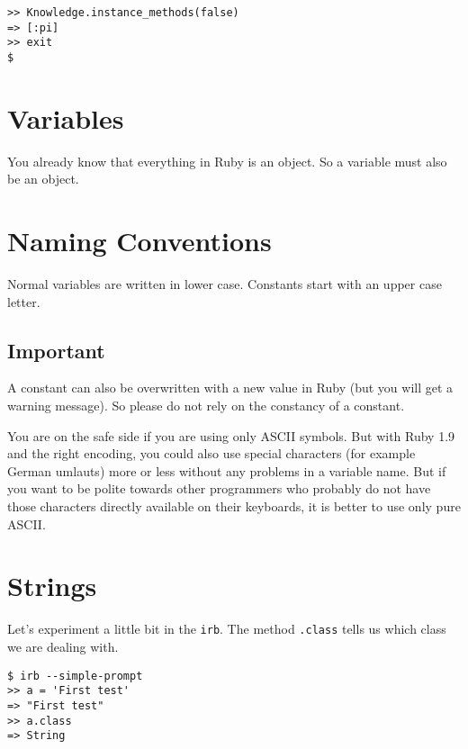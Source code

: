 \documentclass[a4paper]{book}
\begin{document}
\begin{shaded}\begin{verbatim}
>> Knowledge.instance_methods(false)
=> [:pi]
>> exit
$
\end{verbatim}\end{shaded}

\section{Variables}\label{variables}

You already know that everything in Ruby is an object. So a variable must also be an object.

\section{Naming Conventions}\label{naming-conventions}

Normal variables are written in lower case. Constants start with an upper case letter.

\subsection{Important}\label{important-1}

A constant can also be overwritten with a new value in Ruby (but you will get a warning message). So please do not rely on the constancy of a constant.

You are on the safe side if you are using only ASCII symbols. But with Ruby 1.9 and the right encoding, you could also use special characters (for example German umlauts) more or less without any problems in a variable name. But if you want to be polite towards other programmers who probably do not have those characters directly available on their keyboards, it is better to use only pure ASCII.

\section{Strings}\label{strings}

Let's experiment a little bit in the \texttt{irb}. The method \texttt{.class} tells us which class we are dealing with.

\begin{shaded}\begin{verbatim}
$ irb --simple-prompt
>> a = 'First test'
=> "First test"
>> a.class
=> String
\end{verbatim}\end{shaded}
\end{document}
